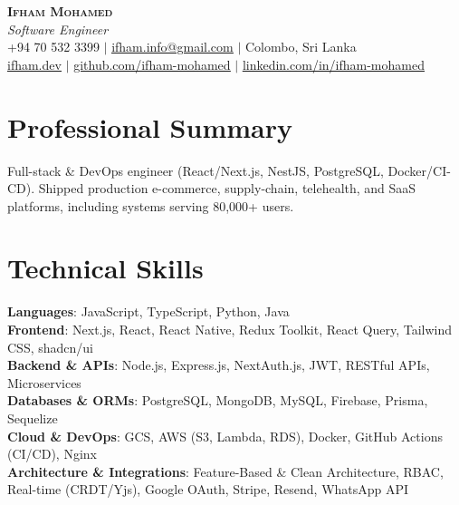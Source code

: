 \documentclass[letterpaper,10pt]{article}
\begin{document}
\begin{center}
    \textbf{\Huge \scshape Ifham Mohamed} \\ \vspace{2pt}
    \small \textit{Software Engineer} \\ \vspace{2pt}
    \small +94 70 532 3399 $|$
    \href{mailto:ifham.info@gmail.com}{\underline{ifham.info@gmail.com}} $|$
    Colombo, Sri Lanka \\ \vspace{2pt}
    \href{https://ifham.dev}{\underline{ifham.dev}} $|$
    \href{https://github.com/ifham-mohamed}{\underline{github.com/ifham-mohamed}} $|$
    \href{https://linkedin.com/in/ifham-mohamed}{\underline{linkedin.com/in/ifham-mohamed}}
\end{center}


\section{Professional Summary}
\small{Full-stack \& DevOps engineer (React/Next.js, NestJS, PostgreSQL, Docker/CI-CD). Shipped production e-commerce, supply-chain, telehealth, and SaaS platforms, including systems serving 80,000+ users.}


\section{Technical Skills}
 \begin{itemize}[leftmargin=0.15in, label={}]
    \small{\item{
     \textbf{Languages}{: JavaScript, TypeScript, Python, Java} \\
     \textbf{Frontend}{: Next.js, React, React Native, Redux Toolkit, React Query, Tailwind CSS, shadcn/ui} \\
     \textbf{Backend \& APIs}{: Node.js, Express.js, NextAuth.js, JWT, RESTful APIs, Microservices} \\
     \textbf{Databases \& ORMs}{: PostgreSQL, MongoDB, MySQL, Firebase, Prisma, Sequelize} \\
     \textbf{Cloud \& DevOps}{: GCS, AWS (S3, Lambda, RDS), Docker, GitHub Actions (CI/CD), Nginx} \\
     \textbf{Architecture \& Integrations}{: Feature-Based \& Clean Architecture, RBAC, Real-time (CRDT/Yjs), Google OAuth, Stripe, Resend, WhatsApp API}
    }}
 \end{itemize}
\end{document}
